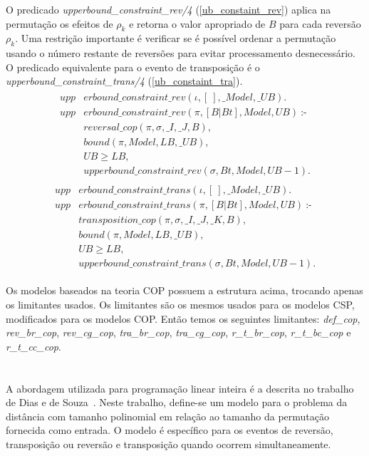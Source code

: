 O predicado \textit{upperbound\_constraint\_rev/4}
(\ref{ub_constaint_rev}) aplica na permutação os efeitos de $\rho_{k}$
e retorna o valor apropriado de $B$ para cada reversão $\rho_{k}$. Uma
restrição importante é verificar se é possível ordenar a permutação
usando o número restante de reversões para evitar processamento
desnecessário. O predicado equivalente para o evento de transposição é
o \textit{upperbound\_constraint\_trans/4} (\ref{ub_constaint_tra}).
\begin{align}
  \label{ub_constaint_rev}
  \begin{split}
  \textit{upp}&\textit{erbound\_constraint\_rev}(\iota, [~], \_Model, \_UB). \\
  \textit{upp}&\textit{erbound\_constraint\_rev}(\pi, [B|Bt], Model, UB)~\text{:-} \\
  &\textit{reversal\_cop}(\pi, \sigma, \_I, \_J, B), \\
  &\textit{bound}(\pi, Model, LB, \_UB), \\
  &UB \ge LB,  \\
  &\textit{upperbound\_constraint\_rev}(\sigma, Bt, Model, UB - 1).
  \end{split}
\end{align}
\begin{align}
  \label{ub_constaint_tra}
  \begin{split}
  \textit{upp}&\textit{erbound\_constraint\_trans}(\iota, [~], \_Model, \_UB). \\
  \textit{upp}&\textit{erbound\_constraint\_trans}(\pi, [B|Bt], Model, UB)~\text{:-} \\
  &\textit{transposition\_cop}(\pi, \sigma, \_I, \_J, \_K, B), \\
  &\textit{bound}(\pi, Model, LB, \_UB), \\
  &UB \ge LB,  \\
  &\textit{upperbound\_constraint\_trans}(\sigma, Bt, Model, UB - 1).
  \end{split}
\end{align}

Os modelos baseados na teoria COP possuem a estrutura acima, trocando
apenas os limitantes usados. Os limitantes são os mesmos usados para
os modelos CSP, modificados para os modelos COP. Então temos os
seguintes limitantes: \textit{def\_cop}, \textit{rev\_br\_cop},
\textit{rev\_cg\_cop}, \textit{tra\_br\_cop}, \textit{tra\_cg\_cop}, 
\textit{r\_t\_br\_cop}, \textit{r\_t\_bc\_cop}
e \textit{r\_t\_cc\_cop}.

\section{\PLI}
\label{sec:pli}
A abordagem utilizada para programação linear inteira é a descrita no
trabalho de Dias e de Souza~\cite{DiasSouza*2007}. Neste trabalho,
define-se um modelo para o problema da distância com tamanho
polinomial em relação ao tamanho da permutação fornecida como
entrada. O modelo é específico para os eventos de reversão,
transposição ou reversão e transposição quando ocorrem
simultaneamente.

